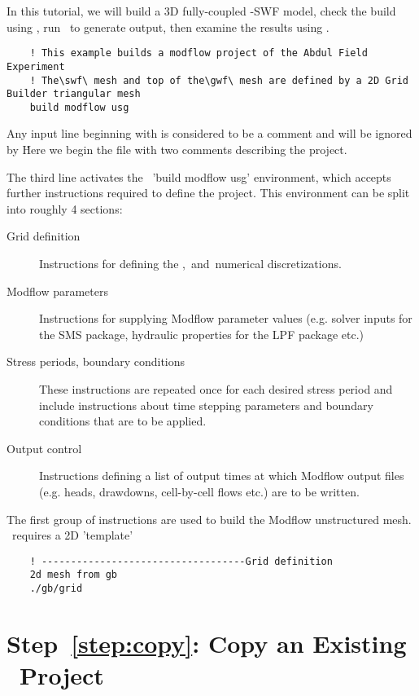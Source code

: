 \label{tutorial:MutUseage} In this tutorial, we will build a 3D fully-coupled \gwf -SWF model, check the build using \tecplot, run \mfus\ to generate output, then examine the results using \tecplot.

\begin{verbatim}
    ! This example builds a modflow project of the Abdul Field Experiment
    ! The\swf\ mesh and top of the\gwf\ mesh are defined by a 2D Grid Builder triangular mesh
    build modflow usg
\end{verbatim}

Any input line beginning with  is considered to be a comment and will be ignored by \mut\.  Here we begin the file with two comments describing the project.

The third line activates the \mut\ 'build modflow usg' environment, which accepts further instructions required to define the project. This environment can be split into roughly 4 sections:
\begin{description}
    \item[Grid definition] Instructions for defining the \gwf,\swf\ and\cln\ numerical discretizations.
    \item[Modflow parameters] Instructions for supplying Modflow parameter values (e.g. solver inputs for the SMS package, hydraulic properties for the LPF package etc.)
    \item[Stress periods, boundary conditions] These instructions are repeated once for each desired stress period and include instructions about time stepping parameters and boundary conditions that are to be applied.
    \item[Output control] Instructions defining a list of output times at which Modflow output files (e.g. heads, drawdowns, cell-by-cell flows etc.) are to be written.
\end{description}


The first group of instructions are used to build the Modflow unstructured mesh. \mut\ requires a 2D 'template'

\begin{verbatim}
    ! -----------------------------------Grid definition
    2d mesh from gb
    ./gb/grid
\end{verbatim}

\section*{Step~\ref{step:copy}: Copy an Existing \mut\ Project}

